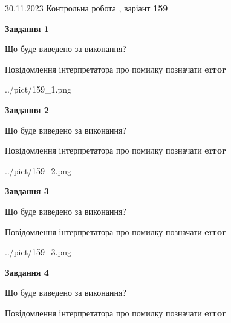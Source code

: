 \documentclass[12pt, ukrainian]{article}
\begin{document}
{{30.11.2023 Контрольна робота , варіант  \No \textbf { 159 }\par}}
{




{\begin {center}\textbf{Завдання 1}\end {center}}\par
Що буде виведено за виконання? \par
Повідомлення інтерпретатора про помилку позначати \textbf{error}

\begin{center}
	{../pict/159_1.png}
\end{center}
\newpage

{\begin {center}\textbf{Завдання 2}\end {center}}\par
Що буде виведено за виконання? \par
Повідомлення інтерпретатора про помилку позначати \textbf{error}

\begin{center}
	{../pict/159_2.png}
\end{center}
\newpage

{\begin {center}\textbf{Завдання 3}\end {center}}\par
Що буде виведено за виконання? \par
Повідомлення інтерпретатора про помилку позначати \textbf{error}

\begin{center}
	{../pict/159_3.png}
\end{center}
\newpage

{\begin {center}\textbf{Завдання 4}\end {center}}\par
Що буде виведено за виконання? \par
Повідомлення інтерпретатора про помилку позначати \textbf{error}

}
\end{document}
